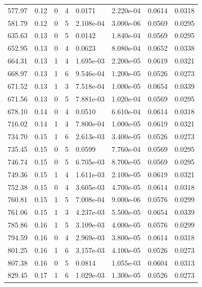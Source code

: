 \documentclass[preview]{standalone}
\begin{document}
{{{\begin{tabular}{L{1.2cm}C{1.2cm} C{0.3cm}C{0.5cm} C{1.4cm}C{1.4cm} C{1.4cm}C{1.4cm}}
  577.97  &  0.12  & 0     &  4 &  0.0171  & 2.220e-04  & 0.0614 &  0.0318   \\ 
  581.79  &  0.12  & 0     &  5 &  2.108e-04  & 3.000e-06  & 0.0569 &  0.0295   \\ 
  635.63  &  0.13  & 0     &  5 &  0.0142  & 1.840e-04  & 0.0569 &  0.0295   \\ 
  652.95  &  0.13  & 0     &  4 &  0.0623  & 8.080e-04  & 0.0652 &  0.0338   \\ 
  664.31  &  0.13  & 1     &  4 &  1.695e-03  & 2.200e-05  & 0.0619 &  0.0321   \\ 
  668.97  &  0.13  & 1     &  6 &  9.546e-04  & 1.200e-05  & 0.0526 &  0.0273   \\ 
  671.52  &  0.13  & 1     &  3 &  7.518e-04  & 1.000e-05  & 0.0654 &  0.0339   \\ 
  671.56  &  0.13  & 0     &  5 &  7.881e-03  & 1.020e-04  & 0.0569 &  0.0295   \\ 
  678.10  &  0.14  & 0     &  4 &  0.0510  & 6.610e-04  & 0.0614 &  0.0318   \\ 
  716.02  &  0.14  & 1     &  4 &  7.800e-04  & 1.000e-05  & 0.0619 &  0.0321   \\ 
  734.70  &  0.15  & 1     &  6 &  2.613e-03  & 3.400e-05  & 0.0526 &  0.0273   \\ 
  735.45  &  0.15  & 0     &  5 &  0.0599  & 7.760e-04  & 0.0569 &  0.0295   \\ 
  746.74  &  0.15  & 0     &  5 &  6.705e-03  & 8.700e-05  & 0.0569 &  0.0295   \\ 
  749.36  &  0.15  & 1     &  4 &  1.611e-03  & 2.100e-05  & 0.0619 &  0.0321   \\ 
  752.38  &  0.15  & 0     &  4 &  3.605e-03  & 4.700e-05  & 0.0614 &  0.0318   \\ 
  760.81  &  0.15  & 1     &  5 &  7.008e-04  & 9.000e-06  & 0.0576 &  0.0299   \\ 
  761.06  &  0.15  & 1     &  3 &  4.237e-03  & 5.500e-05  & 0.0654 &  0.0339   \\ 
  785.86  &  0.16  & 1     &  5 &  3.109e-03  & 4.000e-05  & 0.0576 &  0.0299   \\ 
  794.59  &  0.16  & 0     &  4 &  2.969e-03  & 3.800e-05  & 0.0614 &  0.0318   \\ 
  801.25  &  0.16  & 1     &  6 &  3.157e-03  & 4.100e-05  & 0.0526 &  0.0273   \\ 
  807.38  &  0.16  & 0     &  5 &  0.0814  & 1.055e-03  & 0.0604 &  0.0313   \\ 
  829.45  &  0.17  & 1     &  6 &  1.029e-03  & 1.300e-05  & 0.0526 &  0.0273   \\ 

\end{tabular}}}}
\end{document}
